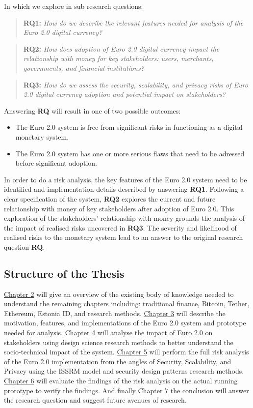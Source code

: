 \documentclass[12pt]{article} %
\begin{document}
In which we explore in sub research questions:
\begin{quotation}
\textbf{RQ1: }\textit{How do we describe the relevant features needed for analysis of the Euro 2.0 digital currency?}
\end{quotation}
\begin{quotation}
\textbf{RQ2: }\textit{How does adoption of Euro 2.0 digital currency impact the relationship with money for key stakeholders: users, merchants, governments, and financial institutions?}
\end{quotation}
\begin{quotation}
\textbf{RQ3: }\textit{How do we assess the security, scalability, and privacy risks of Euro 2.0 digital currency adoption and potential impact on stakeholders?}
\end{quotation}

Answering \textbf{RQ} will result in one of two possible outcomes:
\begin{itemize}
	\item The Euro 2.0 system is free from significant risks in functioning as a digital monetary system.
	\item The Euro 2.0 system has one or more serious flaws that need to be adressed before significant adoption.
\end{itemize}
In order to do a risk analysis, the key features of the Euro 2.0 system need to be identified and implementation details described by answering \textbf{RQ1}. Following a clear specification of the system, \textbf{RQ2} explores the current and future relationship with money of key stakeholders after adoption of Euro 2.0. This exploration of the stakeholders' relationship with money grounds the analysis of the impact of realised risks uncovered in \textbf{RQ3}. The severity and likelihood of realised risks to the monetary system lead to an answer to the original research question \textbf{RQ}.

\subsection{Structure of the Thesis}

\hyperref[sec:2]{Chapter 2} will give an overview of the existing body of knowledge needed to understand the remaining chapters including: traditional finance, Bitcoin, Tether, Ethereum, Estonia ID, and research methods. \hyperref[sec:3]{Chapter 3} will describe the motivation, features, and implementations of the Euro 2.0 system and prototype needed for analysis. \hyperref[sec:4]{Chapter 4} will analyse the impact of Euro 2.0 on stakeholders using design science research methods to better understand the socio-technical impact of the system. \hyperref[sec:5]{Chapter 5} will perform the full risk analysis of the Euro 2.0 implementation from the angles of Security, Scalability, and Privacy using the ISSRM model and security design patterns research methods. \hyperref[sec:6]{Chapter 6} will evaluate the findings of the risk analysis on the actual running prototype to verify the findings. And finally \hyperref[sec:7]{Chapter 7} the conclusion will answer the research question and suggest future avenues of research.
\end{document}

